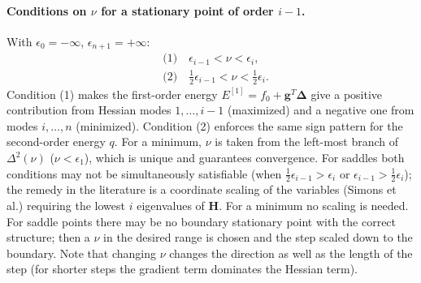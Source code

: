 \documentclass[11pt,a4paper]{article}
\newcommand{\bH}{\mathbf{H}}
\newcommand{\bg}{\mathbf{g}}
\newcommand{\bd}{\boldsymbol{\Delta}}
\begin{document}
\paragraph{Conditions on $\nu$ for a stationary point of order $i-1$.} With $\epsilon_0=-\infty$, $\epsilon_{n+1}=+\infty$:
\begin{align}
 &\text{(1)}\quad \epsilon_{i-1}<\nu<\epsilon_i,\label{eq:c1}\\
 &\text{(2)}\quad \tfrac12\epsilon_{i-1}<\nu<\tfrac12\epsilon_i.\label{eq:c2}
\end{align}
Condition (1) makes the first-order energy $E^{[1]}=f_0+\bg^T\bd$ give a positive contribution from Hessian modes $1,\dots,i-1$ (maximized) and a negative one from modes $i,\dots,n$ (minimized). Condition (2) enforces the same sign pattern for the second-order energy $q$.
For a minimum, $\nu$ is taken from the left-most branch of $\Delta^2(\nu)$ ($\nu<\epsilon_1$), which is unique and guarantees convergence. For saddles both conditions may not be simultaneously satisfiable (when $\tfrac12\epsilon_{i-1}>\epsilon_i$ or $\epsilon_{i-1}>\tfrac12\epsilon_i$); the remedy in the literature is a coordinate scaling of the variables (Simons et al.) requiring the lowest $i$ eigenvalues of $\bH$. For a minimum no scaling is needed.
For saddle points there may be no boundary stationary point with the correct structure; then a $\nu$ in the desired range is chosen and the step scaled down to the boundary.
Note that changing $\nu$ changes the direction as well as the length of the step (for shorter steps the gradient term dominates the Hessian term).
\end{document}
